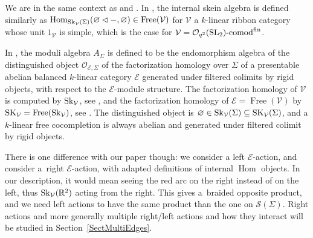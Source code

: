 \documentclass[pdftex]{sigma}%
\numberwithin{equation}{section}
\newcommand{\Free}{\operatorname{Free}}
\newcommand{\Hom}{\operatorname{Hom}}
\newcommand{\Oq}{\mathcal{O}_{q^2}({\rm SL}_2)}
\begin{document}
\begin{Remark} We are in the same context as \cite{BBJ} and \cite{Gunningham}. In \cite[Definition~2.18]{Gunningham}, the internal skein algebra is defined similarly as $\Hom_{{\rm Sk}_\mathcal{V}(\Sigma)}( \varnothing\lhd -,\varnothing) \in \Free(\mathcal{V})$ for $\mathcal{V}$ a $k$-linear ribbon category whose unit $1_\mathcal{V}$ is simple, which is the case for $\mathcal{V}=\Oq\text{-}{\rm comod}^{\rm fin}$.

In \cite[Definition~5.3]{BBJ}, the moduli algebra $A_\Sigma$ is defined to be the endomorphism algebra of the distinguished object $\mathcal{O}_{\mathcal{E},\Sigma}$ of the factorization homology over $\Sigma$ of a presentable abelian balanced $k$-linear category $\mathcal{E}$ generated under filtered colimits by rigid objects, with respect to the $\mathcal{E}$-module structure. The factorization homology of $\mathcal{V}$ is computed by ${\rm Sk}_\mathcal{V}$, see \cite[Theorem~2.28]{Cooke}, and the factorization homology of $\mathcal{E} = \Free(\mathcal{V})$ by ${\rm SK}_\mathcal{V} = \Free({\rm Sk}_\mathcal{V})$, see \cite[Theorem~3.27]{Cooke}. The distinguished object is $\varnothing \in {\rm Sk}_\mathcal{V}(\Sigma) \subseteq {\rm SK}_\mathcal{V}(\Sigma)$, and a $k$-linear free cocompletion is always abelian and generated under filtered colimit by rigid objects.

There is one difference with our paper though: we consider a left $\mathcal{E}$-action, and \cite{BBJ,Gunningham} consider a~right $\mathcal{E}$-action, with adapted definitions of internal $\Hom$ objects. In our description, it would mean seeing the red arc on the right instead of on the left, thus ${\rm Sk}_\mathcal{V}(\mathbb{R}^2)$ acting from the right. This gives a~braided opposite product, and we need left actions to have the same product than the one on $\mathscr{S}(\Sigma)$. Right actions and more generally multiple right/left actions and how they interact will be studied in Section~\ref{SectMultiEdges}.
\end{Remark}
\end{document}
